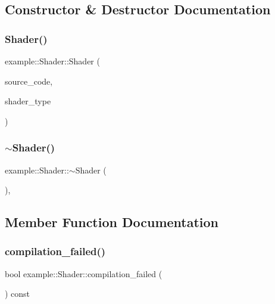 \subsection{Constructor \& Destructor Documentation}
\mbox{\label{classexample_1_1_shader_a59b388f5122bdacd19a92b1ff71bcf97}} 
\subsubsection{Shader()}
{\footnotesize\ttfamily example\+::\+Shader\+::\+Shader (\begin{DoxyParamCaption}\item[{const \textbf{ Source\+\_\+\+Code} \&}]{source\+\_\+code,  }\item[{G\+Lenum}]{shader\+\_\+type }\end{DoxyParamCaption})\hspace{0.3cm}{\ttfamily [protected]}}

\mbox{\label{classexample_1_1_shader_adffb3500548af9fc8d4a2d00db6ad465}} 
\subsubsection{$\sim$Shader()}
{\footnotesize\ttfamily example\+::\+Shader\+::$\sim$\+Shader (\begin{DoxyParamCaption}{ }\end{DoxyParamCaption})\hspace{0.3cm}{\ttfamily [protected]}, {\ttfamily [virtual]}}



\subsection{Member Function Documentation}
\mbox{\label{classexample_1_1_shader_ae2203671e91aa91ae726e9c3b1894077}} 
\subsubsection{compilation\_failed()}
{\footnotesize\ttfamily bool example\+::\+Shader\+::compilation\+\_\+failed (\begin{DoxyParamCaption}{ }\end{DoxyParamCaption}) const\hspace{0.3cm}{\ttfamily [inline]}}

